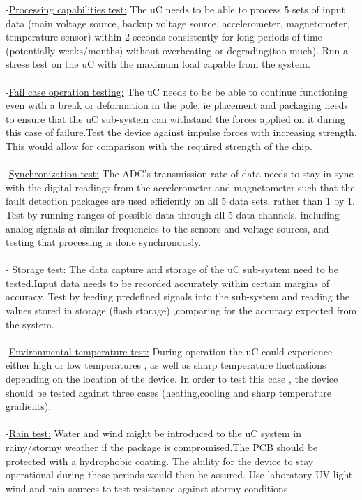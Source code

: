 \documentclass[12pt]{article}
\begin{document}
-\underline{Processing capabilities test:} The uC needs to be able to process 5 sets of input data (main voltage source, backup voltage source, accelerometer, magnetometer, temperature sensor) within 2 seconds consistently for long periods of time (potentially weeks/months) without overheating or degrading(too much). Run a stress test on the uC with the maximum load capable from the system.\\
\\
-\underline{Fail case operation testing:} The uC needs to be be able to continue functioning even with a break or deformation in the pole, ie placement and packaging needs to ensure that the uC sub-system can withstand the forces applied on it during this case of failure.Test the device against impulse forces with increasing strength. This would allow for comparison with the required strength of the chip.\\
\\
-\underline{Synchronization test:} The ADC's transmission rate of data needs to stay in sync with the digital readings from the accelerometer and magnetometer such that the fault detection packages are used efficiently on all 5 data sets, rather than 1 by 1. Test by running ranges of possible data through all 5 data channels, including analog signals at similar frequencies to the sensors and voltage sources, and testing that processing is done synchronously.\\
\\
- \underline{Storage test:} The data capture and storage of the uC sub-system need to be tested.Input data needs to be recorded accurately within certain margins of accuracy. Test by feeding predefined signals into the sub-system and reading the values stored in storage (flash storage) ,comparing for the accuracy expected from the system.\\ 
\\
-\underline{Environmental temperature test:} During operation the uC could experience either high or low temperatures , as well as sharp temperature fluctuations depending on the location of the device. In order to test this case , the device should be tested against three cases (heating,cooling and sharp temperature gradients).\\
\\
-\underline{Rain test:} Water and wind might be introduced to the uC system in rainy/stormy weather if the package is compromised.The PCB should be protected with a hydrophobic coating. The ability for the device to stay operational during these periods would then be assured. Use laboratory UV light, wind and rain sources to test resistance against stormy conditions.\\
\newpage
\end{document}
